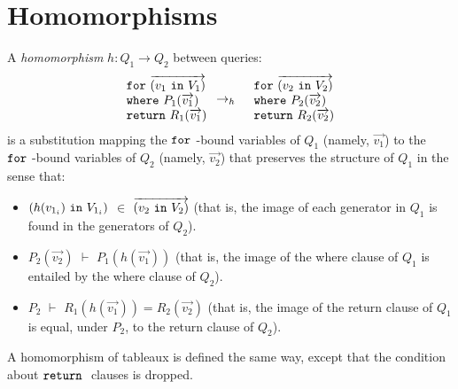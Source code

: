 \documentclass[preprint]{sigplanconf}
\newcommand{\FOR}{{\tt for} \ }
\newcommand{\WHERE}{{\tt where} \ }
\newcommand{\IN}{ \ {\tt in} \ }
\newcommand{\RETURN}{{\tt return} \ }
\begin{document}
\section{Homomorphisms}

A {\it homomorphism} $h : Q_1 \to Q_2$ between queries:
\begin{eqnarray*}
\begin{array}{l}
\FOR \overrightarrow{(v_1 \IN V_1)} \\
\WHERE P_1(\overrightarrow{v_1}) \\
\RETURN R_1(\overrightarrow{v_1})
\end{array} & \to_h &
\begin{array}{l}
\FOR \overrightarrow{(v_2 \IN V_2)} \\
\WHERE P_2(\overrightarrow{v_2}) \\
\RETURN R_2(\overrightarrow{v_2})
\end{array}
\end{eqnarray*}
is a substitution mapping the $\FOR$-bound variables of $Q_1$ (namely, $
\overrightarrow{v_1}$) to the $\FOR$-bound variables of $Q_2$ (namely, $
\overrightarrow{v_2}$) that preserves the structure of $Q_1$ in the sense that:
\begin{itemize}
\item  
 $(h(v_{1_i}) \IN V_{1_i})$ $ \in$ $\overrightarrow{(v_2 \IN V_2)}$ (that is, the image of each generator in $Q_1$ is found in the generators of $Q_2$). 

\item $P_2(\overrightarrow{v_2})$ $\vdash$ $P_1(h(\overrightarrow{v_1}))$  (that is, the image of the where clause of $Q_1$ is entailed by the where clause of $Q_2$).

\item $P_2$ $\vdash$ $R_1(h(\overrightarrow{v_1})) = R_2(\overrightarrow{v_2})$ (that is, the image of the return clause of $Q_1$ is equal, under $P_2$, to the return clause of $Q_2$).
\end{itemize}
A homomorphism of tableaux is defined the same way, except that the condition about $\RETURN$ clauses is dropped.  
\end{document}

